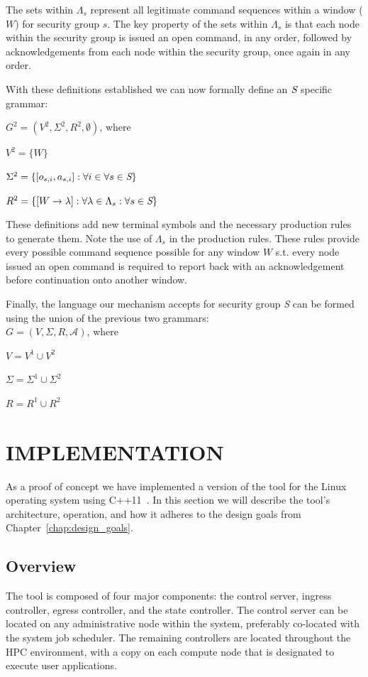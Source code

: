 \documentclass[oneside,12pt]{memoir}
\newcommand{\tab}{\hspace*{2em}}
\begin{document}
The sets within $\Lambda_s$ represent all legitimate command sequences within a window ($W$) for security group $s$. The key property of the sets within $\Lambda_s$ is that each node within the security group is issued an open command, in any order, followed by acknowledgements from each node within the security group, once again in any order.

With these definitions established we can now formally define an $\emph{S}$ specific grammar:

\tab $G^2 = (V^2, \Sigma^2, R^2, \emptyset)$, where

\tab $V^2 =\{W\}$

\tab $\Sigma ^2 = \{[o_{s,i}, a_{s,i}]:\forall i \in \forall s\in \emph{S}\}$

\tab $R^2 = \{[W\rightarrow \lambda  ] :\forall \lambda \in \Lambda_s :\forall s\in \emph{S}\}$


These definitions add new terminal symbols and the necessary production rules to generate them. Note the use of $\Lambda_s$ in the production rules. These rules provide every possible command sequence possible for any window $W$ s.t. every node issued an open command is required to report back with an acknowledgement before continuation onto another window.

Finally, the language our mechanism accepts for security group \emph{S} can be formed using the union of the previous two grammars:\\

\tab $G = (V, \Sigma , R, \mathcal{A})$, where

\tab $V = V^1\cup V^2$

\tab $\Sigma = \Sigma ^1\cup \Sigma ^2$

\tab $R = R^1\cup R^2$
\chapter{IMPLEMENTATION}
\label{chap:implementation}
As a proof of concept we have implemented a version of the tool for the Linux operating system using C++11~\cite{iso2012iec}. In this section we will describe the tool's architecture, operation, and how it adheres to the design goals from Chapter~\ref{chap:design_goals}.
\section{Overview}
The tool is composed of four major components:  the control server, ingress controller, egress controller, and the state controller. The control server can be located on any administrative node within the system, preferably co-located with the system job scheduler. The remaining controllers are located throughout the HPC environment, with a copy on each compute node that is designated to execute user applications. 
\end{document}
